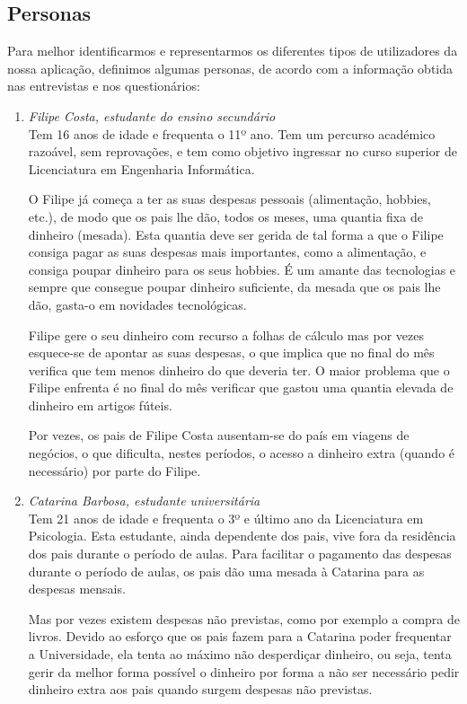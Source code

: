 \documentclass{article}
\begin{document}
  \subsection{Personas}

    Para melhor identificarmos e representarmos os diferentes tipos de utilizadores da nossa aplicação, definimos algumas personas, de acordo com a informação obtida nas entrevistas e nos questionários:

    \begin{enumerate}
      \item \emph{Filipe Costa, estudante do ensino secundário}\\
            Tem 16 anos de idade e frequenta o 11º ano. Tem um percurso académico razoável, sem reprovações, e tem como objetivo ingressar no curso superior de Licenciatura em Engenharia Informática.

            O Filipe já começa a ter as suas despesas pessoais (alimentação, hobbies, etc.), de modo que os pais lhe dão, todos os meses, uma quantia fixa de dinheiro (mesada). Esta quantia deve ser gerida de tal forma a que o Filipe consiga pagar as suas despesas mais importantes, como a alimentação, e consiga poupar dinheiro para os seus hobbies. É um amante das tecnologias e sempre que consegue poupar dinheiro suficiente, da mesada que os pais lhe dão, gasta-o em novidades tecnológicas.

            Filipe gere o seu dinheiro com recurso a folhas de cálculo mas por vezes esquece-se de apontar as suas despesas, o que implica que no final do mês verifica que tem menos dinheiro do que deveria ter. O maior problema que o Filipe enfrenta é no final do mês verificar que gastou uma quantia elevada de dinheiro em artigos fúteis.

            Por vezes, os pais de Filipe Costa ausentam-se do país em viagens de negócios, o que dificulta, nestes períodos, o acesso a dinheiro extra (quando é necessário) por parte do Filipe.

      \item \emph{Catarina Barbosa, estudante universitária}\\
            Tem 21 anos de idade e frequenta o 3º e último ano da Licenciatura em Psicologia. Esta estudante, ainda dependente dos pais, vive fora da residência dos pais durante o período de aulas. Para facilitar o pagamento das despesas durante o período de aulas, os pais dão uma mesada à Catarina para as despesas mensais.

            Mas por vezes existem despesas não previstas, como por exemplo a compra de livros. Devido ao esforço que os pais fazem para a Catarina poder frequentar a Universidade, ela tenta ao máximo não desperdiçar dinheiro, ou seja, tenta gerir da melhor forma possível o dinheiro por forma a não ser necessário pedir dinheiro extra aos pais quando surgem despesas não previstas.


\end{enumerate}
\end{document}
